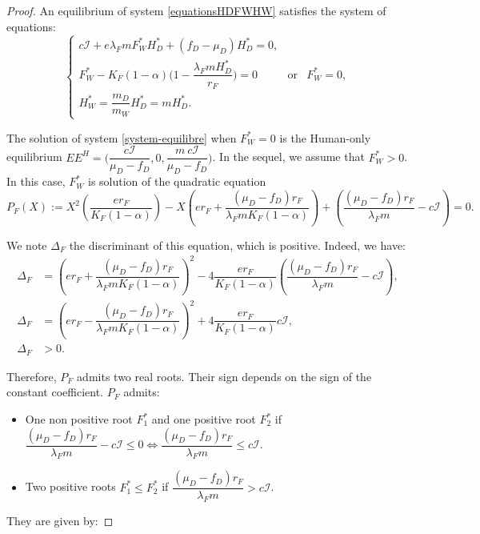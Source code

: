 \documentclass{article}
\newcommand{\lfw}{\lambda_{F}}
\newcommand{\lfw}{\lambda_{F}}
\begin{document}
\begin{proof}
An equilibrium of system \eqref{equationsHDFWHW} satisfies the system of equations:
\begin{equation}\label{system-equilibre}
\left\lbrace \begin{array}{cll}
c\mathcal{I} + e \lfw m F_W^* H_D^* + (f_D - \mu_D) H_D^* = 0,&&\\
F_W^* - K_F(1-\alpha) \Big(1 - \dfrac{\lfw m H^*_D}{r_F} \Big) = 0& \mbox{or} & F^*_W = 0,\\
H_W^* = \dfrac{m_D}{m_W} H_D^* = m H_D^*.&&
\end{array} \right.
\end{equation}

The solution of system \eqref{system-equilibre} when $F_W^* = 0$ is the Human-only equilibrium $EE^{H} = \Big(\dfrac{c\mathcal{I}}{\mu_D - f_D}, 0, \dfrac{m \ c\mathcal{I}}{\mu_D - f_D} \Big)$.
In the sequel, we assume that $F_W^* > 0$. In this case, $F^*_W$ is solution of the quadratic equation
\begin{equation}
P_F(X) := X^2 \left(\dfrac{er_F}{K_F(1-\alpha)} \right) - X \left(er_F + \dfrac{(\mu_D - f_D) r_F}{\lfw m K_F(1-\alpha)} \right) + \left(\dfrac{(\mu_D - f_D) r_F}{\lfw m} - c\mathcal{I} \right) = 0.
\label{polynome-Feq}
\end{equation}

We note $\Delta_F$ the discriminant of this equation, which is positive. Indeed, we have:
\begin{align*}
\Delta_F &= \left(er_F + \dfrac{(\mu_D - f_D) r_F}{\lfw m K_F(1-\alpha)} \right)^2 - 4\dfrac{er_F}{K_F(1-\alpha)}  \left(\dfrac{(\mu_D -f_D) r_F}{\lfw m} - c\mathcal{I} \right), \\
\Delta_F &= \left(er_F - \dfrac{(\mu_D - f_D) r_F}{\lfw m K_F(1-\alpha)} \right)^2 + 4\dfrac{er_F}{K_F(1-\alpha)}  c\mathcal{I}, \\
\Delta_F & > 0.
\end{align*}

Therefore, $P_F$ admits two real roots. Their sign depends on the sign of the constant coefficient. $P_F$ admits:
\begin{itemize}
\item One non positive root $F^*_1$ and one positive root $F^*_2$ if $\dfrac{(\mu_D - f_D) r_F}{\lfw m} - c\mathcal{I} \leq 0 \Leftrightarrow \dfrac{(\mu_D - f_D) r_F}{\lfw m } \leq c\mathcal{I}.$
\item Two positive roots $F^*_1\leq  F^*_2$ if $\dfrac{(\mu_D - f_D) r_F}{\lfw m } > c\mathcal{I}$.
\end{itemize}
They are given by:


\end{proof}
\end{document}
